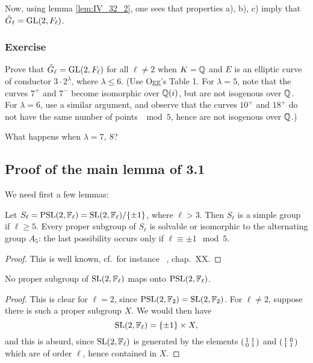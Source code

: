 Now, using lemma \ref{lem:IV_32_2}, one sees that properties a), b), c) imply
that $\tilde{G}_\ell = \operatorname{GL}(2, F_\ell)$.  

\subsubsection*{Exercise}

Prove that $\tilde{G}_\ell = \operatorname{GL}(2, F_\ell)$ for all $\ell \neq 2$ when $K = \mathbb{Q}$
and $E$ is an elliptic curve of conductor $3 \cdot 2^\lambda$, where $\lambda
\leq 6$. (Use Ogg's Table 1. For $\lambda = 5$, note that the curves $7^+$ and
$7^-$ become isomorphic over $\mathbb{Q}(i)$, but are not isogenous over $\mathbb{Q}$. For
$\lambda = 6$, use a similar argument, and observe that the curves $10^+$ and
$18^+$ do not have the same number of points $\mod 5$, hence are not isogenous
over $\mathbb{Q}$.)

What happens when $\lambda = 7,~8$?

\subsection{Proof of the main lemma of 3.1}
\label{sec:IV_34}
\dpage
We need first a few lemmas:
\begin{lem}\label{lem:IV_34_1}
	Let $S_\ell = \operatorname{PSL}(2, \mathbb{F}_\ell) = \operatorname{SL}(2, \mathbb{F}_\ell)/\{ \pm 1 \}$, where
	$\ell > 3$.
	Then $S_\ell$ is a simple group if $\ell \ge 5$. Every proper subgroup
	of $S_\ell$ is solvable or isomorphic to the alternating group $A_5$:
	the last possibility occurs only if $\ell \equiv \pm 1 \mod 5$.
\end{lem}
\begin{proof}
	This is well known, cf.\ for instance \citeauthor{4}~\cite{4}, chap.\ XX.
\end{proof}

\begin{lem}\label{lem:IV_34_2}
	No proper subgroup of $\operatorname{SL}(2, \mathbb{F}_\ell)$ maps onto $\operatorname{PSL}(2, \mathbb{F}_\ell)$.
\end{lem}
\begin{proof}
	This is clear for $\ell = 2$, since $\operatorname{PSL}(2, \mathbb{F}_2) = \operatorname{SL}(2, \mathbb{F}_2)$. For
	$\ell \ne 2$, suppose there is such a proper subgroup $X$. We would then
	have
	\[
		\operatorname{SL}(2, \mathbb{F}_\ell) = \{ \pm 1 \}\times X,
	\]
	and this is absurd, since $\operatorname{SL}(2, \mathbb{F}_\ell)$ is generated by the elements
	$\begin{psmallmatrix}
		1 & 1 \\
		0 & 1
	\end{psmallmatrix}$
	and
	$\begin{psmallmatrix}
		1 & 0 \\
		1 & 1
	\end{psmallmatrix}$
	which are of order $\ell$, hence contained in $X$.
\end{proof}


